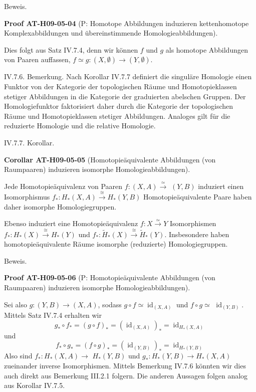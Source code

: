 \documentclass[10pt, letterpaper]{article}
\newcommand{\CustomHeading}[3]{%
  \par\medskip\noindent%
  \textbf{#1 #2} \textnormal{(#3)}.\enskip%
}
\newenvironment{KORO}[2]{\begin{unitbox}\CustomHeading{Corollar}{#1}{#2}}{\end{unitbox}}
\newenvironment{PROOF}[2]{\begin{unitbox}\CustomHeading{Proof}{#1}{#2}}{\end{unitbox}}
\begin{document}
Beweis. 

\begin{PROOF}{AT-H09-05-04}{P: Homotope Abbildungen induzieren kettenhomotope Komplexabbildungen und übereinstimmende Homologieabbildungen}
Dies folgt aus Satz IV.7.4, denn wir können $f$ und $g$ als homotope Abbildungen von Paaren auffassen, $f \simeq g:(X, \emptyset) \rightarrow(Y, \emptyset)$.
\end{PROOF}



IV.7.6. Bemerkung. Nach Korollar IV.7.7 definiert die singuläre Homologie einen Funktor von der Kategorie der topologischen Räume und Homotopieklassen stetiger Abbildungen in die Kategorie der graduierten abelschen Gruppen. Der Homologiefunktor faktorisiert daher durch die Kategorie der topologischen Räume und Homotopieklassen stetiger Abbildungen. Analoges gilt für die reduzierte Homologie und die relative Homologie.


IV.7.7. Korollar. 

\begin{KORO}{AT-H09-05-05}{Homotopieäquivalente Abbildungen (von Raumpaaren) induzieren isomorphe Homologieabbildungen}
Jede Homotopieäquivalenz von Paaren $f:(X, A) \xrightarrow{\simeq}$ $(Y, B)$ induziert einen Isomorphismus $f_*: H_*(X, A) \stackrel{\cong}{\rightarrow} H_*(Y, B)$ Homotopieäquivalente Paare haben daher isomorphe Homologiegruppen. 

Ebenso induziert eine Homotopieäquivalenz $f: X \xrightarrow{\simeq} Y$ Isomorphismen $f_*: H_*(X) \xrightarrow{\cong} H_*(Y)$ und $f_*: \tilde{H}_*(X) \stackrel{\cong}{\rightarrow} \tilde{H}_*(Y)$. Insbesondere haben homotopieäquivalente Räume isomorphe (reduzierte) Homologiegruppen.
\end{KORO}

Beweis. 

\begin{PROOF}{AT-H09-05-06}{P: Homotopieäquivalente Abbildungen (von Raumpaaren) induzieren isomorphe Homologieabbildungen}
Sei also $g:(Y, B) \rightarrow(X, A)$, sodass $g \circ f \simeq \operatorname{id}_{(X, A)}$ und $f \circ g \simeq$ $\operatorname{id}_{(Y, B)}$. Mittels Satz IV.7.4 erhalten wir 
$$g_* \circ f_*=(g \circ f)_*=\left(\operatorname{id}_{(X, A)}\right)_*=\operatorname{id}_{H_*(X, A)}$$ 
und 
$$f_* \circ g_*=(f \circ g)_*=\left(\operatorname{id}_{(Y, B)}\right)_*=\operatorname{id}_{H_*(Y, B)}$$ 
Also sind $f_*: H_*(X, A) \rightarrow$ $H_*(Y, B)$ und $g_*: H_*(Y, B) \rightarrow H_*(X, A)$ zueinander inverse Isomorphismen. Mittels Bemerkung IV.7.6 könnten wir dies auch direkt aus Bemerkung III.2.1 folgern. Die anderen Aussagen folgen analog aus Korollar IV.7.5.
\end{PROOF}
\end{document}
